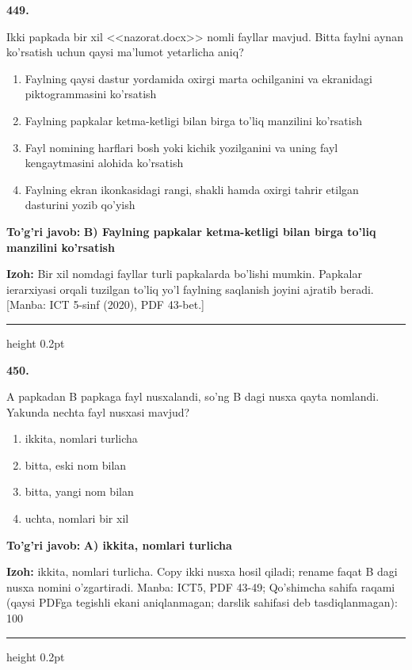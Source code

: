 \documentclass[10pt,a4paper]{article}
\begin{document}
{\bfseries\sffamily\color{ink} 449.}
\par
Ikki papkada bir xil <<nazorat.docx>> nomli fayllar mavjud. Bitta faylni aynan ko'rsatish uchun qaysi ma'lumot yetarlicha aniq?
\begin{enumerate}[label=\Alph*),leftmargin=9mm]
\item Faylning qaysi dastur yordamida oxirgi marta ochilganini va ekranidagi piktogrammasini ko'rsatish
\item Faylning papkalar ketma-ketligi bilan birga to'liq manzilini ko'rsatish
\item Fayl nomining harflari bosh yoki kichik yozilganini va uning fayl kengaytmasini alohida ko'rsatish
\item Faylning ekran ikonkasidagi rangi, shakli hamda oxirgi tahrir etilgan dasturini yozib qo'yish
\end{enumerate}
\begin{tcolorbox}[enhanced,breakable,colback=teal!4,colframe=teal!60!black,boxrule=0.45pt,arc=1.2mm,left=2.7mm,right=2.7mm,top=1.8mm,bottom=1.8mm,before skip=2mm,after skip=2mm]
{\bfseries\sffamily\color{teal}To'g'ri javob:} \textbf{B) Faylning papkalar ketma-ketligi bilan birga to'liq manzilini ko'rsatish}
\par\smallskip
{\bfseries Izoh:} Bir xil nomdagi fayllar turli papkalarda bo'lishi mumkin. Papkalar ierarxiyasi orqali tuzilgan to'liq yo'l faylning saqlanish joyini ajratib beradi. [Manba: ICT 5-sinf (2020), PDF 43-bet.]
\end{tcolorbox}
\vspace{2mm}\hrule height 0.2pt\vspace{3mm}

{\bfseries\sffamily\color{ink} 450.}
\par
A papkadan B papkaga fayl nusxalandi, so'ng B dagi nusxa qayta nomlandi. Yakunda nechta fayl nusxasi mavjud?
\begin{enumerate}[label=\Alph*),leftmargin=9mm]
\item ikkita, nomlari turlicha
\item bitta, eski nom bilan
\item bitta, yangi nom bilan
\item uchta, nomlari bir xil
\end{enumerate}
\begin{tcolorbox}[enhanced,breakable,colback=teal!4,colframe=teal!60!black,boxrule=0.45pt,arc=1.2mm,left=2.7mm,right=2.7mm,top=1.8mm,bottom=1.8mm,before skip=2mm,after skip=2mm]
{\bfseries\sffamily\color{teal}To'g'ri javob:} \textbf{A) ikkita, nomlari turlicha}
\par\smallskip
{\bfseries Izoh:} ikkita, nomlari turlicha. Copy ikki nusxa hosil qiladi; rename faqat B dagi nusxa nomini o'zgartiradi. Manba: ICT5, PDF 43-49; Qo'shimcha sahifa raqami (qaysi PDFga tegishli ekani aniqlanmagan; darslik sahifasi deb tasdiqlanmagan): 100
\end{tcolorbox}
\vspace{2mm}\hrule height 0.2pt\vspace{3mm}
\end{document}
